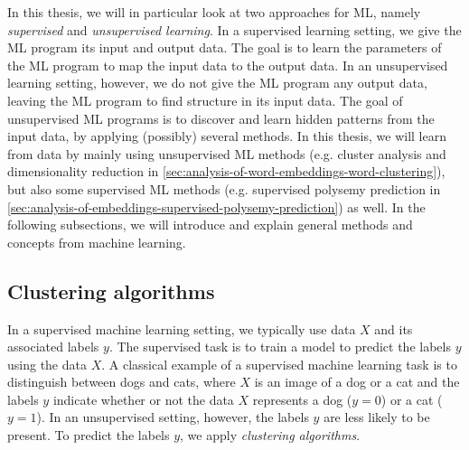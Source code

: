 In this thesis, we will in particular look at two approaches for ML, namely \textit{supervised} and \textit{unsupervised learning}. In a supervised learning setting, we give the ML program its input and output data. The goal is to learn the parameters of the ML program to map the input data to the output data. In an unsupervised learning setting, however, we do not give the ML program any output data, leaving the ML program to find structure in its input data. The goal of unsupervised ML programs is to discover and learn hidden patterns from the input data, by applying (possibly) several methods. In this thesis, we will learn from data by mainly using unsupervised ML methods (e.g. cluster analysis and dimensionality reduction in \cref{sec:analysis-of-word-embeddings-word-clustering}), but also some supervised ML methods (e.g. supervised polysemy prediction in \cref{sec:analysis-of-embeddings-supervised-polysemy-prediction}) as well. In the following subsections, we will introduce and explain general methods and concepts from machine learning.

\subsection{Clustering algorithms}
\label{sec:clustering-algorithms}
In a supervised machine learning setting, we typically use data $X$ and its associated labels $y$. The supervised task is to train a model to predict the labels $y$ using the data $X$. A classical example of a supervised machine learning task is to distinguish between dogs and cats, where $X$ is an image of a dog or a cat and the labels $y$ indicate whether or not the data $X$ represents a dog ($y=0$) or a cat ($y=1$). In an unsupervised setting, however, the labels $y$ are less likely to be present. To predict the labels $y$, we apply \textit{clustering algorithms}.

